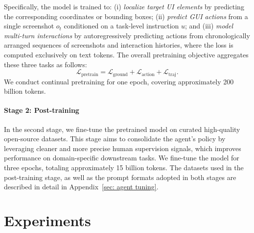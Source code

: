 \documentclass{llmxive}
\begin{document}
Specifically, the model is trained to: (i) \textit{localize target UI elements} by predicting the corresponding coordinates or bounding boxes; (ii) \textit{predict GUI actions} from a single screenshot $o_t$ conditioned on a task-level instruction $u$; and (iii) \textit{model multi-turn interactions} by autoregressively predicting actions from chronologically arranged sequences of screenshots and interaction histories, where the loss is computed exclusively on text tokens.
The overall pretraining objective aggregates these three tasks as follows:
\begin{equation}
\mathcal{L}_{\text{pretrain}} = \mathcal{L}_{\text{ground}} + \mathcal{L}_{\text{action}} + \mathcal{L}_{\text{traj}}.
\end{equation}
We conduct continual pretraining for one epoch, covering approximately 200 billion tokens.

\paragraph{Stage 2: Post-training}
In the second stage, we fine-tune the pretrained model on curated high-quality open-source datasets. This stage aims to consolidate the agent's policy by leveraging cleaner and more precise human supervision signals, which improves performance on domain-specific downstream tasks.  We fine-tune the model for three epochs, totaling approximately 15 billion tokens. The datasets used in the post-training stage, as well as the prompt formats adopted in both stages are described in detail in Appendix~\ref{sec: agent tuning}.


\section{Experiments}
\end{document}

